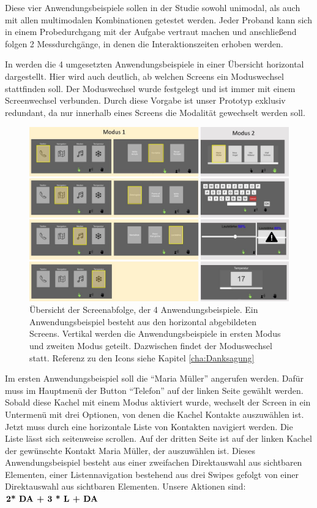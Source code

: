 Diese vier Anwendungsbeispiele sollen in der Studie sowohl unimodal, als auch mit allen multimodalen Kombinationen getestet werden. 
Jeder Proband kann sich in einem Probedurchgang mit der Aufgabe vertraut machen und anschließend folgen 2 Messdurchgänge, in denen die Interaktionszeiten erhoben werden. 

In  werden die 4 umgesetzten Anwendungsbeispiele in einer Übersicht horizontal dargestellt. 
Hier wird auch deutlich, ab welchen Screens ein Moduswechsel stattfinden soll. 
Der Moduswechsel wurde festgelegt und ist immer mit einem Screenwechsel verbunden. 
Durch diese Vorgabe ist unser Prototyp exklusiv redundant, da nur innerhalb eines Screens die Modalität gewechselt werden soll. 
\begin{figure}[ht]
  \centering
  \includegraphics[width=1\textwidth]{img/UseCases2.jpg}
  \caption[Übersicht der Screenabfolge, der 4 Anwendungsbeispiele.]{Übersicht der Screenabfolge, der 4 Anwendungsbeispiele. Ein Anwendungsbeispiel besteht aus den horizontal abgebildeten Screens. Vertikal werden die Anwendungsbeispiele in ersten Modus und zweiten Modus geteilt. Dazwischen findet der Moduswechsel statt. Referenz zu den Icons siehe Kapitel \ref{cha:Danksagung}}
  \label{fig:UseCases}
\end{figure}

Im ersten Anwendungsbeispiel soll die "`Maria Müller"' angerufen werden. Dafür muss im Hauptmenü der Button "`Telefon"' auf der linken Seite gewählt werden. 
Sobald diese Kachel mit einem Modus aktiviert wurde, wechselt der Screen in ein Untermenü mit drei Optionen, von denen die Kachel Kontakte auszuwählen ist. 
Jetzt muss durch eine horizontale Liste von Kontakten navigiert werden. 
Die Liste lässt sich seitenweise scrollen. 
Auf der dritten Seite ist auf der linken Kachel der gewünschte Kontakt Maria Müller, der auszuwählen ist. 
Dieses Anwendungsbeispiel besteht aus einer zweifachen Direktauswahl aus sichtbaren Elementen, einer Listennavigation bestehend aus drei Swipes gefolgt von einer Direktauswahl aus sichtbaren Elementen. 
Unsere Aktionen sind: $\textbf{2* \text{DA} + 3 * \text{L} + \text{DA}}$

